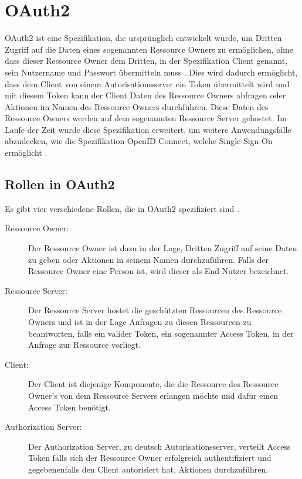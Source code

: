 %
%
\section{OAuth2}
\label{sec:OAuth2}
OAuth2 ist eine Spezifikation, die ursprünglich entwickelt wurde, um Dritten Zugriff auf die Daten eines sogenannten Ressource Owners zu ermöglichen, ohne dass dieser Ressource Owner dem Dritten, in der Spezifikation Client genannt, sein Nutzername und Passwort übermitteln muss \citep{oauth2:2012}. Dies wird dadurch ermöglicht, dass dem Client von einem Autorisationsserver ein Token übermittelt wird und mit diesem Token kann der Client Daten des Ressource Owners abfragen oder Aktionen im Namen des Ressource Owners durchführen. Diese Daten des Ressource Owners werden auf dem sogenannten Ressource Server gehostet.
Im Laufe der Zeit wurde diese Spezifikation erweitert, um weitere Anwendungsfälle abzudecken, wie die Spezifikation OpenID Connect, welche Single-Sign-On ermöglicht \citep{openidconnect:2014}. 

\subsection{Rollen in OAuth2}
\label{subsec:OAuth2:RolleninOAuth2}
Es gibt vier verschiedene Rollen, die in OAuth2 spezifiziert sind \citep{oauth2:2012}.

\begin{description}
  \item[Ressource Owner:] Der Ressource Owner ist dazu in der Lage, Dritten Zugriff auf seine Daten zu geben oder Aktionen in seinem Namen durchzuführen. Falls der Ressource Owner eine Person ist, wird dieser als End-Nutzer bezeichnet.
  \item[Ressource Server:] Der Ressource Server hostet die geschützten Ressourcen des Ressource Owners und ist in der Lage Anfragen zu diesen Ressourcen zu beantworten, falls ein valider Token, ein sogenannter Access Token, in der Anfrage zur Ressource vorliegt.
  \item[Client:] Der Client ist diejenige Komponente, die die Ressource des Ressource Owner's von dem Ressource Servers erlangen möchte und dafür einen Access Token benötigt. 
  \item[Authorization Server:] Der Authorization Server, zu deutsch Autorisationsserver, verteilt Access Token falls sich der Ressource Owner erfolgreich authentifiziert und gegebenenfalls den Client autorisiert hat, Aktionen durchzuführen. 
\end{description}

